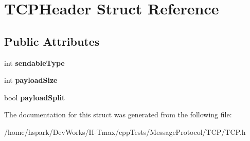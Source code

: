 \hypertarget{structTCPHeader}{\section{T\-C\-P\-Header Struct Reference}
\label{structTCPHeader}
}
\subsection*{Public Attributes}
\begin{DoxyCompactItemize}
\item 
\hypertarget{structTCPHeader_a61c09fc896a293dcbbab75586b782221}{int {\bfseries sendable\-Type}}\label{structTCPHeader_a61c09fc896a293dcbbab75586b782221}

\item 
\hypertarget{structTCPHeader_a6bbddb1f01512ba4e20a462d520fc8c6}{int {\bfseries payload\-Size}}\label{structTCPHeader_a6bbddb1f01512ba4e20a462d520fc8c6}

\item 
\hypertarget{structTCPHeader_a7b984e1a1c433954f80a6a1a8221f096}{bool {\bfseries payload\-Split}}\label{structTCPHeader_a7b984e1a1c433954f80a6a1a8221f096}

\end{DoxyCompactItemize}


The documentation for this struct was generated from the following file\-:\begin{DoxyCompactItemize}
\item 
/home/hspark/\-Dev\-Works/\-H-\/\-Tmax/cpp\-Tests/\-Message\-Protocol/\-T\-C\-P/T\-C\-P.\-h\end{DoxyCompactItemize}
